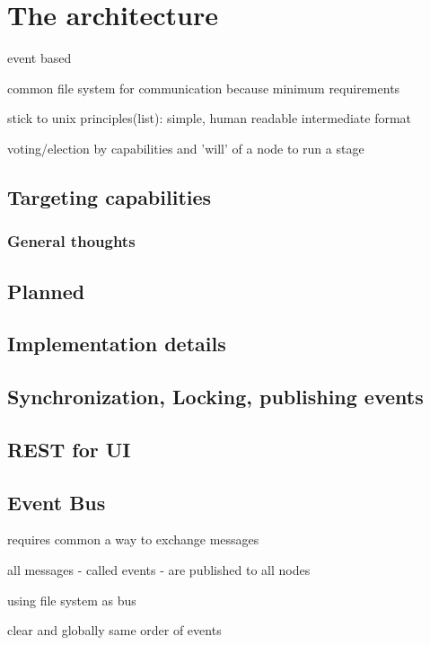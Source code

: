 \chapter{The architecture}

event based

common file system for communication because minimum requirements

stick to unix principles(list): simple, human readable intermediate format

voting/election by capabilities and 'will' of a node to run a stage

\section{Targeting capabilities}

\subsection{General thoughts}

\section{Planned}

\section{Implementation details}

\section{Synchronization, Locking, publishing events}

\section{REST for UI}



\section{Event Bus}

requires common a way to exchange messages

all messages - called events - are published to all nodes

using file system as bus

clear and globally same order of events

